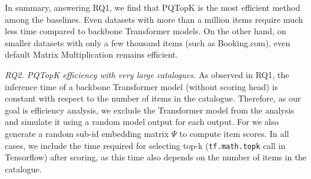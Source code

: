 \documentclass[sigconf,natbib=true, review=true]{acmart} %
\newcommand{\pageenlarge}[1]{\marginnote{#1}\enlargethispage{#1\baselineskip}}
\newcommand{\rsasha}[1]{\textcolor[HTML]{FF0000}{#1}}
\begin{document}
In summary, answering RQ1, we find that PQTopK is the most efficient method among the baselines. Even datasets with more than a million items require much less time compared to backbone Transformer models. On the other hand, on smaller datasets with only a few thousand items (such as Booking.com), even default Matrix Multiplication remains efficient. 

\pageenlarge{3}
\textit{RQ2. PQTopK efficiency with very large catalogues.} As observed in RQ1, the inference time of a backbone Transformer model (without scoring head) is constant with respect to the number of items in the catalogue. Therefore, as our goal is efficiency analysis, we exclude the Transformer model from the analysis and simulate it using a random model output for each output. For we also generate a random sub-id embedding matrix $\Psi$ to compute item scores. In all cases, we include the time required for selecting top-k (\rsasha{\texttt{tf.math.topk} call in Tensorflow}) after scoring, as this time also depends on the number of items in the catalogue. 
\end{document}
